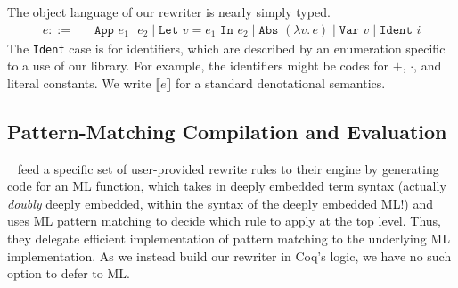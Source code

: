 \documentclass[a4paper,USenglish,cleveref,autoref,thm-restate]{lipics-v2021}
\newcommand{\citet}[1]{\usebibentry{#1}{citet}~\cite{#1}}
\newcommand{\defeq}{=}
\begin{document}

The object language of our rewriter is nearly simply typed. %
\begin{align*}
  e ::={}& \phantom{\mid} \texttt{App }e_1\texttt{ }e_2 \mid \texttt{Let }v \defeq e_1\texttt{ In }e_2 %
  \mid \texttt{Abs }(\lambda v.\,e) \mid \texttt{Var }v \mid \texttt{Ident }i
\end{align*}
The \texttt{Ident} case is for identifiers, which are described by an enumeration specific to a use of our library.
For example, the identifiers might be codes for $+$, $\cdot$, and literal constants.
We write $\llbracket e \rrbracket$ for a standard denotational semantics.\label{sec:denote-brackets-def}

\subsection{Pattern-Matching Compilation and Evaluation}\label{sec:pattern-matching-compilation-and-evaluation}

\citet{Aehlig} feed a specific set of user-provided rewrite rules to their engine by generating code for an ML function, which takes in deeply embedded term syntax (actually \emph{doubly} deeply embedded, within the syntax of the deeply embedded ML!) and uses ML pattern matching to decide which rule to apply at the top level.
Thus, they delegate efficient implementation of pattern matching to the underlying ML implementation.
As we instead build our rewriter in Coq's logic, we have no such option to defer to ML.
\end{document}
